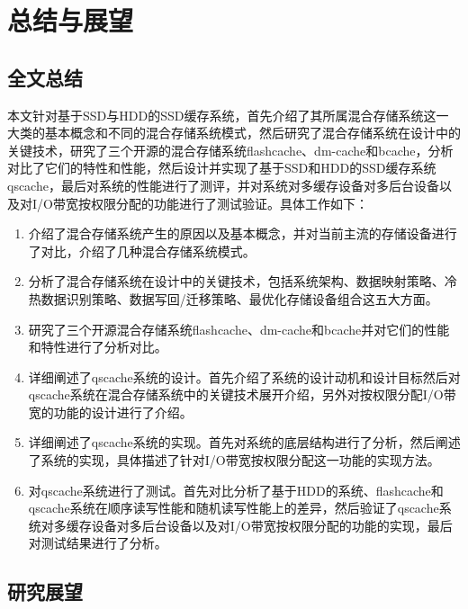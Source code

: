 

\chapter{总结与展望}
\label{chap:summary}

\section{全文总结}

本文针对基于SSD与HDD的SSD缓存系统，首先介绍了其所属混合存储系统这一大类的基本概念和不同的混合存储系统模式，然后研究了混合存储系统在设计中的关键技术，研究了三个开源的混合存储系统flashcache、dm-cache和bcache，分析对比了它们的特性和性能，然后设计并实现了基于SSD和HDD的SSD缓存系统qscache，最后对系统的性能进行了测评，并对系统对多缓存设备对多后台设备以及对I/O带宽按权限分配的功能进行了测试验证。具体工作如下：

\begin{enumerate}[wide]
    \item 介绍了混合存储系统产生的原因以及基本概念，并对当前主流的存储设备进行了对比，介绍了几种混合存储系统模式。
    \item 分析了混合存储系统在设计中的关键技术，包括系统架构、数据映射策略、冷热数据识别策略、数据写回/迁移策略、最优化存储设备组合这五大方面。
    \item 研究了三个开源混合存储系统flashcache、dm-cache和bcache并对它们的性能和特性进行了分析对比。
    \item 详细阐述了qscache系统的设计。首先介绍了系统的设计动机和设计目标然后对qscache系统在混合存储系统中的关键技术展开介绍，另外对按权限分配I/O带宽的功能的设计进行了介绍。
    \item 详细阐述了qscache系统的实现。首先对系统的底层结构进行了分析，然后阐述了系统的实现，具体描述了针对I/O带宽按权限分配这一功能的实现方法。
    \item 对qscache系统进行了测试。首先对比分析了基于HDD的系统、flashcache和qscache系统在顺序读写性能和随机读写性能上的差异，然后验证了qscache系统对多缓存设备对多后台设备以及对I/O带宽按权限分配的功能的实现，最后对测试结果进行了分析。
\end{enumerate}

\section{研究展望}

